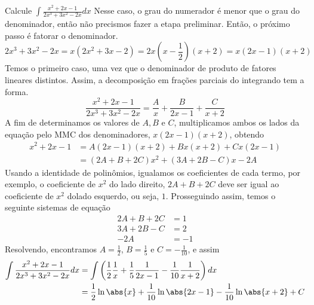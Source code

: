 \begin{example}
  Calcule \(\int \frac{x^2+2x-1}{2x^3+3x^2-2x}dx\)
  \solution
  Nesse caso, o grau do numerador é menor que o grau do denominador, então não
  precismos fazer a etapa preliminar. Então, o próximo passo é fatorar o
  denominador.
  \[
    2x^3+3x^2-2x
    = x(2x^2+3x-2)
    = 2x(x- \frac{1}{2})(x+2)
    = x(2x-1)(x+2)
  \]
  Temos o primeiro caso, uma vez que o denominador de produto de fatores
  lineares distintos. Assim, a decomposição em frações parciais do integrando
  tem a forma.
  \[
    \frac{x^2+2x-1}{2x^3+3x^2-2x}
    = \frac{A}{x}
    + \frac{B}{2x-1}
    + \frac{C}{x+2}
  \]
  A fim de determinamos os valores de $A,B$ e $C$, multiplicamos ambos os
  lados da equação pelo MMC dos denominadores, $x(2x-1)(x+2)$, obtendo
  \begin{align*}
    x^2+2x-1
    & = A(2x-1)(x+2)+Bx(x+2)+ Cx(2x-1) \\
    & = (2A+B +2C)x^2+ (3A+2B-C)x-2A
  \end{align*}
  Usando a identidade de polinômios, igualamos os coeficientes de cada termo,
  por exemplo, o coeficiente de $x^2 $ do lado direito, $2A+B +2C$ deve ser
  igual ao coeficiente de $x^2$ dolado esquerdo, ou seja, $1$. Prosseguindo
  assim, temos o seguinte sistemas de equação
  \begin{align*}
    2A+B +2C & = 1 \\
    3A+2B-C  & = 2 \\
    -2A      & =-1
  \end{align*}
  Resolvendo, encontramos
  $A= \frac{1}{2}$,
  $B= \frac{1}{5}$ e
  $C=-\frac{1}{10}$,
  e assim
  \begin{align*}
    \int \frac{x^2+2x-1}{2x^3+3x^2-2x} dx
    & = \int \left(
                \frac{1}{2}  \frac{1}{x}
              + \frac{1}{5}  \frac{1}{2x-1}
              - \frac{1}{10} \frac{1}{x+2}
             \right) dx \\
    & = \frac{1}{2}  \ln\abs{x}
      + \frac{1}{10} \ln\abs{2x-1}
      - \frac{1}{10} \ln\abs{x+2}
      + C
  \end{align*}
\end{example}


